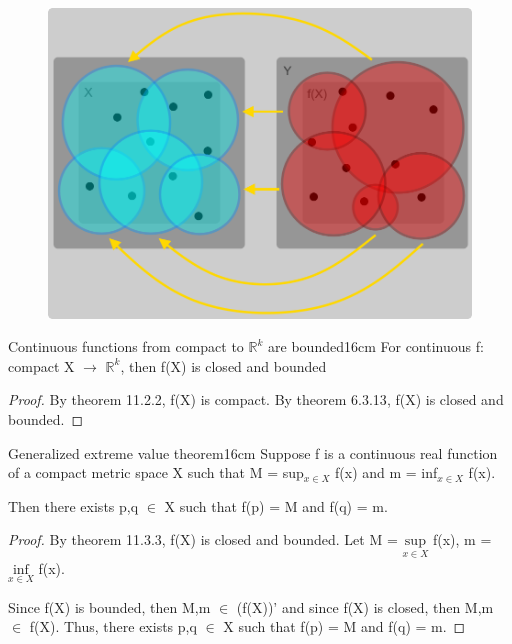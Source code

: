     \begin{figure}[h]
        \centering
        \includegraphics[scale=0.28]{Images/11.3.2.png}
    \end{figure}



    \begin{wtheorem}{Continuous functions from compact to
    $\mathbb{R}^k$ are bounded}{16cm}
        For continuous f: compact X $\rightarrow$ $\mathbb{R}^k$,
        then f(X) is closed and bounded
    \end{wtheorem}

    \begin{proof}
        By {\color{red} theorem 11.2.2}, f(X) is compact.
        By {\color{red} theorem 6.3.13}, f(X) is closed and bounded.
    \end{proof}

    \vspace{0.5cm}



    \begin{wtheorem}{Generalized extreme value theorem}{16cm}
        Suppose f is a continuous real function of a compact metric space X
        such that M = sup$_{x \in X}$ f(x) and m = inf$_{x \in X}$ f(x).

        Then there exists p,q $\in$ X such that f(p) = M and f(q) = m.        
    \end{wtheorem}

    \begin{proof}
        By {\color{red} theorem 11.3.3}, f(X) is closed and bounded.
        Let M = $\underset{x \in X}{\text{sup}}$ f(x),
        m = $\underset{x \in X}{\text{inf}}$ f(x).

        Since f(X) is bounded, then M,m $\in$ (f(X))' and
        since f(X) is closed, then M,m $\in$ f(X).
        Thus, there exists p,q $\in$ X such that f(p) = M and f(q) = m.
    \end{proof}

